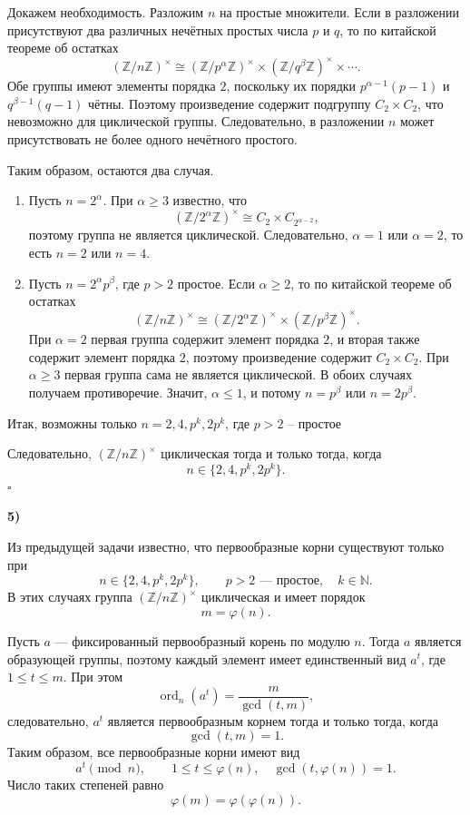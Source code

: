 \documentclass[12pt,a4paper]{article}
\newcommand{\soli}[1]{%
  \par\vspace{0.15\baselineskip}%
  \noindent\textbf{#1)}\ %
  \ignorespaces                     %
}
\begin{document}
Докажем необходимость. Разложим $n$ на простые множители. Если в разложении присутствуют два различных нечётных простых числа $p$ и $q$, то по китайской теореме об остатках
\[
(\mathbb{Z}/n\mathbb{Z})^\times\cong
(\mathbb{Z}/p^\alpha\mathbb{Z})^\times\times
(\mathbb{Z}/q^\beta\mathbb{Z})^\times\times\cdots.
\]
Обе группы имеют элементы порядка $2$, поскольку их порядки $p^{\alpha-1}(p-1)$ и $q^{\beta-1}(q-1)$ чётны. Поэтому произведение содержит подгруппу $C_2\times C_2$, что невозможно для циклической группы. Следовательно, в разложении $n$ может присутствовать не более одного нечётного простого.

Таким образом, остаются два случая.

\begin{enumerate}
    \item Пусть $n=2^\alpha$. При $\alpha\ge3$ известно, что
    \[
    (\mathbb{Z}/2^\alpha\mathbb{Z})^\times
    \cong C_2\times C_{2^{\alpha-2}},
    \]
    поэтому группа не является циклической. Следовательно, $\alpha=1$ или $\alpha=2$, то есть $n=2$ или $n=4$.

    \item Пусть $n=2^\alpha p^\beta$, где $p>2$ простое. Если $\alpha\ge2$, то по китайской теореме об остатках
    \[
    (\mathbb{Z}/n\mathbb{Z})^\times\cong
    (\mathbb{Z}/2^\alpha\mathbb{Z})^\times\times
    (\mathbb{Z}/p^\beta\mathbb{Z})^\times.
    \]
    При $\alpha=2$ первая группа содержит элемент порядка $2$, и вторая также содержит элемент порядка $2$, поэтому произведение содержит $C_2\times C_2$. При $\alpha\ge3$ первая группа сама не является циклической. В обоих случаях получаем противоречие. Значит, $\alpha\le1$, и потому $n=p^\beta$ или $n=2p^\beta$.
\end{enumerate}

Итак, возможны только $n = 2, 4, p^k, 2p^k$, где $p > 2$ -- простое


Следовательно, $(\mathbb{Z}/n\mathbb{Z})^\times$ циклическая тогда и только тогда, когда
\[
n\in\{2,4,p^k,2p^k\}.
\] \hfill $\square$

\soli{5}

Из предыдущей задачи известно, что первообразные корни существуют только при
\[
n\in\{2,4,p^k,2p^k\},\qquad p>2\text{ --- простое},\quad k\in\mathbb N.
\]
В этих случаях группа $(\mathbb Z/n\mathbb Z)^\times$ циклическая и имеет порядок
\[
m=\varphi(n).
\]

Пусть $a$ --- фиксированный первообразный корень по модулю $n$. Тогда $a$ является образующей группы, поэтому каждый элемент имеет единственный вид $a^t$, где $1\le t\le m$. При этом
\[
\operatorname{ord}_n(a^t)=\frac{m}{\gcd(t,m)},
\]
следовательно, $a^t$ является первообразным корнем тогда и только тогда, когда
\[
\gcd(t,m)=1.
\]
Таким образом, все первообразные корни имеют вид
\[
\boxed{a^t\pmod n,\qquad 1\le t\le\varphi(n),\quad
\gcd(t,\varphi(n))=1.}
\]
Число таких степеней равно
\[
\boxed{\varphi(m)=\varphi(\varphi(n))}.
\]
\end{document}
